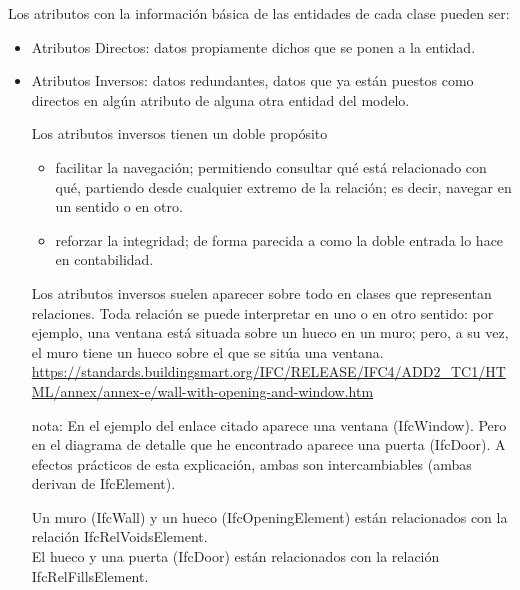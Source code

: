 \documentclass[spanish,10pt,a4paper,final,oneside]{article}
\begin{document}
Los atributos con la información básica de las entidades de cada clase pueden ser:
\begin{itemize}
\item Atributos Directos: datos propiamente dichos que se ponen a la entidad.

\item Atributos Inversos: datos redundantes, datos que ya están puestos como directos en algún atributo de alguna otra entidad del modelo.

Los atributos inversos tienen un doble propósito
\begin{itemize}
\item facilitar la navegación; permitiendo consultar qué está relacionado con qué, partiendo desde cualquier extremo de la relación; es decir, navegar en un sentido o en otro.
\item reforzar la integridad; de forma parecida a como la doble entrada lo hace en contabilidad.
\end{itemize}

Los atributos inversos suelen aparecer sobre todo en clases que representan relaciones. Toda relación se puede interpretar en uno o en otro sentido: por ejemplo, una ventana está situada sobre un hueco en un muro; pero, a su vez, el muro tiene un hueco sobre el que se sitúa una ventana.
\\ \url{https://standards.buildingsmart.org/IFC/RELEASE/IFC4/ADD2_TC1/HTML/annex/annex-e/wall-with-opening-and-window.htm}

\begin{footnotesize}
nota: En el ejemplo del enlace citado aparece una ventana (IfcWindow). Pero en el diagrama de detalle que he encontrado aparece una puerta (IfcDoor). A efectos prácticos de esta explicación, ambas son intercambiables (ambas derivan de IfcElement). 

\end{footnotesize}
Un muro (IfcWall) y un hueco (IfcOpeningElement) están relacionados con la relación IfcRelVoidsElement.
\\El hueco y una puerta (IfcDoor) están relacionados con la relación IfcRelFillsElement.


\end{itemize}
\end{document}
